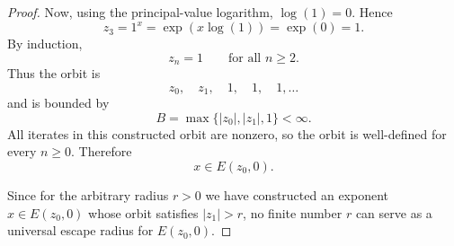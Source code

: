 \documentclass[10pt,a4paper]{amsart}
\begin{document}
\begin{proof}
Now, using the principal-value logarithm, $\log(1)=0$. Hence
\[
z_3
=
1^x
=
\exp(x\log(1))
=
\exp(0)
=
1.
\]
By induction,
\[
z_n=1
\qquad\text{for all }n\ge 2.
\]
Thus the orbit is
\[
z_0,\quad z_1,\quad 1,\quad 1,\quad 1,\ldots
\]
and is bounded by
\[
B=\max\{|z_0|,|z_1|,1\}<\infty.
\]
All iterates in this constructed orbit are nonzero, so the orbit is
well-defined for every $n\ge 0$. Therefore
\[
x\in E(z_0,0).
\]

Since for the arbitrary radius $r>0$ we have constructed an exponent
$x\in E(z_0,0)$ whose orbit satisfies $|z_1|>r$, no finite number $r$ can
serve as a universal escape radius for $E(z_0,0)$.
\end{proof}
\end{document}

